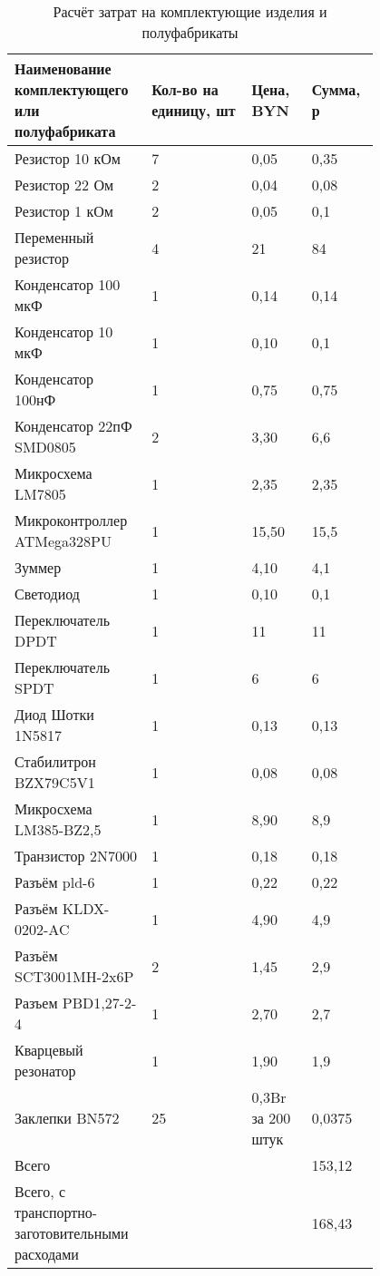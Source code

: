 \begin{table}[H]
  \caption{Расчёт затрат на комплектующие изделия и полуфабрикаты}
  \small
  \begin{tabular}{| p{0.25\linewidth} |  p{0.25\linewidth} |  p{0.15\linewidth} |  p{0.15\linewidth} |}
    \hline
Наименование комплектующего или полуфабриката & Кол-во на единицу, шт & Цена, BYN & Сумма, р\\[0pt]
\hline
  Резистор 10 кОм & 7 & 0,05 & 0,35 \\[0pt]
  \hline
  Резистор 22 Ом  & 2 & 0,04 & 0,08 \\[0pt]
  \hline
  Резистор 1 кОм  & 2 & 0,05 & 0,1\\[0pt]
  \hline
  Переменный резистор & 4 & 21 & 84\\[0pt]
  \hline
  Конденсатор 100 мкФ & 1 & 0,14 & 0,14\\[0pt]
  \hline
  Конденсатор 10 мкФ  & 1 & 0,10 & 0,1\\[0pt]
  \hline
  Конденсатор 100нФ & 1 & 0,75 & 0,75 \\[0pt]
  \hline
  Конденсатор 22пФ SMD0805 & 2 & 3,30 & 6,6\\[0pt]
  \hline
  Микросхема LM7805 & 1 & 2,35 & 2,35 \\[0pt]
  \hline
  Микроконтроллер ATMega328PU & 1 & 15,50 & 15,5 \\[0pt]
  \hline
  Зуммер & 1 & 4,10 & 4,1 \\[0pt]
  \hline
  Светодиод & 1 & 0,10 & 0,1 \\[0pt]
  \hline
  Переключатель DPDT & 1 & 11 & 11 \\[0pt]
  \hline
  Переключатель SPDT & 1 & 6 & 6\\[0pt]
  \hline
  Диод Шотки 1N5817 & 1 & 0,13 & 0,13 \\[0pt]
  \hline
  Стабилитрон BZX79C5V1 & 1 & 0,08 & 0,08 \\[0pt]
  \hline
  Микросхема LM385-BZ2,5 & 1 & 8,90 & 8,9\\[0pt]
  \hline
  Транзистор 2N7000 & 1 & 0,18 & 0,18 \\[0pt]
  \hline
  Разъём pld-6 & 1 & 0,22 & 0,22 \\[0pt]
  \hline
  Разъём KLDX-0202-AC & 1 & 4,90 & 4,9 \\[0pt]
  \hline
  Разъём SCT3001MH-2x6P & 2 & 1,45 & 2,9 \\[0pt]
  \hline
  Разъем PBD1,27-2-4 & 1 & 2,70 & 2,7 \\[0pt]
  \hline
  Кварцевый резонатор & 1 & 1,90 & 1,9\\[0pt]
  \hline
  Заклепки BN572 & 25 & 0,3Br за 200 штук & 0,0375\\[0pt]
  \hline
  Всего &  &  & 153,12\\[0pt]
  \hline
  Всего, с транспортно-заготовительными расходами &  &  & 168,43\\[0pt]
  \hline
\end{tabular}
\end{table}


